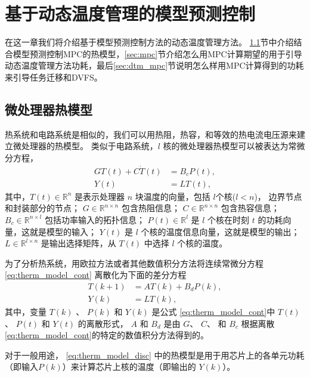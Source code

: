 
\chapter{基于动态温度管理的模型预测控制}

在这一章我们将介绍基于模型预测控制方法的动态温度管理方法。
\ref{sec:therm_model}节中介绍结合模型预测控制MPC的热模型，\ref{sec:mpc}节介绍怎么用MPC计算期望的用于引导动态温度管理方法功耗，最后\ref{sec:dtm_mpc}节说明怎么样用MPC计算得到的功耗来引导任务迁移和DVFS。
\section{微处理器热模型}\label{sec:therm_model}
热系统和电路系统是相似的，我们可以用热阻，热容，和等效的热电流电压源来建立微处理器的热模型。
类似于电路系统，$l$ 核的微处理器热模型可以被表达为常微分方程，
\begin{equation}\label{eq:therm_model_cont} 
\begin{split}
G T(t) + C \dot{T}(t) &= B_c P(t),\\
Y(t) &= L T(t),
\end{split}
\end{equation}
其中，$T(t) \in \mathbb{R}^n$ 是表示处理器 $n$ 块温度的向量，包括 $l$个核($l < n$)， 边界节点和封装部分的节点；
$G \in \mathbb{R}^{n\times n}$ 包含热阻信息； 
$C \in \mathbb{R}^{n \times n}$ 包含热容信息；
$B_c \in \mathbb{R}^{n \times l}$ 包括功率输入的拓扑信息；
$P(t) \in \mathbb{R}^{l}$ 是 $l$ 个核在时刻 $t$ 的功耗向量，这就是模型的输入；
$Y(t)$ 是 $l$ 个核的温度信息向量，这就是模型的输出；
$L \in \mathbb{R}^{l \times n}$ 是输出选择矩阵，从 $T(t)$ 中选择 $l$ 个核的温度。

为了分析热系统，用欧拉方法或者其他数值积分方法将连续常微分方程 \eqref{eq:therm_model_cont} 离散化为下面的差分方程
\begin{equation}\label{eq:therm_model_disc}
\begin{split}
T(k+1) &= A T(k)+B_d P(k),\\
Y(k) &= L T(k),
\end{split}
\end{equation}
其中，变量 $T(k)$ 、 $P(k)$ 和 $Y(k)$ 是公式 \eqref{eq:therm_model_cont}中
$T(t)$ 、 $P(t)$ 和 $Y(t)$ 的离散形式，  $A$ 和
$B_d$ 是由 $G$、 $C$、 和 $B_c$ 根据离散\eqref{eq:therm_model_cont}的特定的数值积分方法得到的。

对于一般用途， \eqref{eq:therm_model_disc} 中的热模型是用于用芯片上的各单元功耗（即输入$P(k)$）来计算芯片上核的温度（即输出的 $Y(k)$）。

